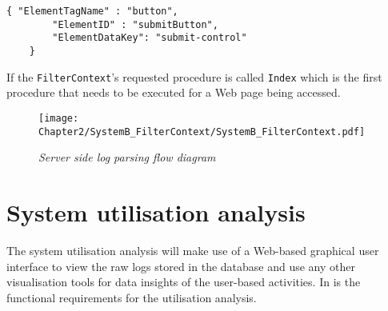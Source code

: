 \begin{lstlisting}[style=json, caption={\textit{Element properties JSON}}, label={fig:Ch2_ElementInfo}] 
	{ "ElementTagName" : "button",
		"ElementID" : "submitButton",
		"ElementDataKey": "submit-control"		
	}
\end{lstlisting}

If the \texttt{FilterContext}'s requested procedure is called \texttt{Index} which is the first procedure that needs to be executed for a Web page being accessed.

\begin{figure}[!htb]
	\centering
	\texttt{[image: Chapter2/SystemB\_FilterContext/SystemB\_FilterContext.pdf]}
	\caption[Server side log parsing flow diagram]
	{\textit{Server side log parsing flow diagram}}\label{fig:ch2_loggingParse}
\end{figure}

\clearpage

\section{System utilisation analysis}\label{ch2:sec_system_utilisation_analysis}
The system utilisation analysis will make use of a Web-based graphical user interface to view the raw logs stored in the database and use any other visualisation tools for data insights of the user-based activities. In  is the functional requirements for the utilisation analysis.

